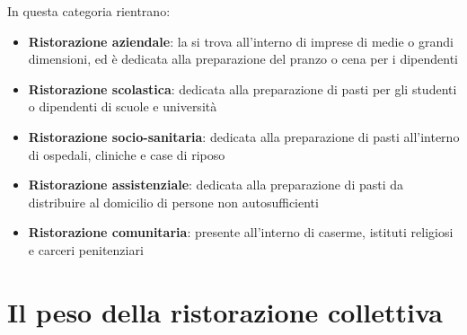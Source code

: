 \documentclass[a4paper, titlepage, 12pt, openright, twoside]{book}
\begin{document}
\begin{itemize}
											In questa categoria rientrano:
											\begin{itemize}
												\item \textbf{Ristorazione aziendale}: la si trova all'interno di imprese di medie o grandi dimensioni, ed è dedicata alla preparazione
																						del pranzo o cena per i dipendenti
												\item \textbf{Ristorazione scolastica}: dedicata alla preparazione di pasti per gli studenti o dipendenti di scuole e università
												\item \textbf{Ristorazione socio-sanitaria}: dedicata alla preparazione di pasti all'interno di ospedali, cliniche e case di riposo
												\item \textbf{Ristorazione assistenziale}: dedicata alla preparazione di pasti da distribuire al domicilio di persone 
																							non autosufficienti
												\item \textbf{Ristorazione comunitaria}: presente all'interno di caserme, istituti religiosi e carceri penitenziari
											\end{itemize}
\end{itemize}

\section{Il peso della ristorazione collettiva}
\end{document}
